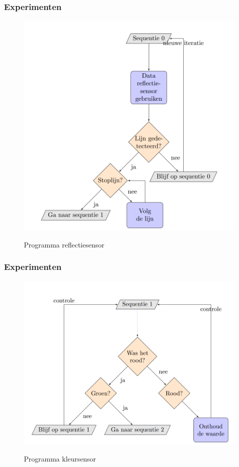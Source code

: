 \documentclass
   [kulak] %
   {kulakbeamer}
\begin{document}
\begin{frame}
	\frametitle{Experimenten}
	\begin{figure}
		\centering
		\includegraphics[width=.7\textwidth]{flowchart_sequentie0}
		\caption{Programma reflectiesensor}\cite{}
	\end{figure}
\end{frame}

\begin{frame}
	\frametitle{Experimenten}
	\begin{figure}
		\centering
		\includegraphics[width=.7\textwidth]{flowchart_sequentie1}
		\caption{Programma kleursensor}\cite{}
	\end{figure}
\end{frame}
\end{document}
